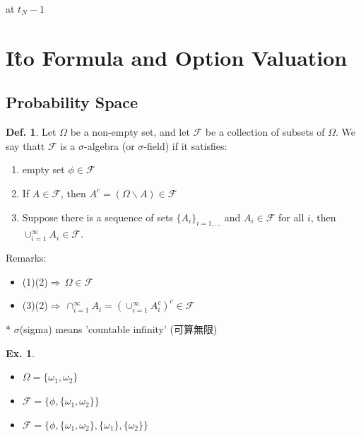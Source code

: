 \documentclass[a4paper,11pt]{jsarticle}
\theoremstyle{definition}
\newtheorem{definition}{Def.}[subsection]
\newtheorem{ex}{Ex.}[subsection]
\begin{document}
at $t_N-1$



\newpage
\section{I\^{t}o Formula and Option Valuation}

\subsection{Probability Space}

\begin{definition}
  Let $\Omega$ be a non-empty set, and let $\mathcal{F}$ be
  a collection of subsets of $\Omega$. We say thatt $\mathcal{F}$
  is a $\sigma$-algebra (or $\sigma$-field) if it satisfies:
  \begin{enumerate}
    \item empty set $\phi\in\mathcal{F}$
    \item If $A\in\mathcal{F}$, then
    $A^c=(\Omega\backslash A) \in\mathcal{F}$
    \item Suppose there is a sequence of sets $\{A_i\}_{i=1,...}$
    and $A_i \in\mathcal{F}$ for all $i$, then
    $\cup_{i=1}^{\infty} A_i\in\mathcal{F}$.
  \end{enumerate}   
\end{definition}

Remarks:
\begin{itemize}
  \item (1)(2)$\Rightarrow \, \Omega\in\mathcal{F}$
  \item (3)(2)$\Rightarrow \, \cap_{i=1}^{\infty} A_i
  ={(\cup_{i=1}^{\infty} A_i^c)}^c \in \mathcal{F}$
\end{itemize}

* $\sigma$(sigma) means 'countable infinity' (可算無限)

\begin{ex}

  \begin{itemize}
    \item $\Omega=\{ \omega_1, \omega_2 \} $
    \item $\mathcal{F}=\{ \phi, \{\omega_1, \omega_2\} \} $
    \item $\mathcal{F}=\{ \phi, \{\omega_1, \omega_2\} ,
    \{\omega_1\} , \{\omega_2 \} \} $
  \end{itemize}
\end{ex}
\end{document}
